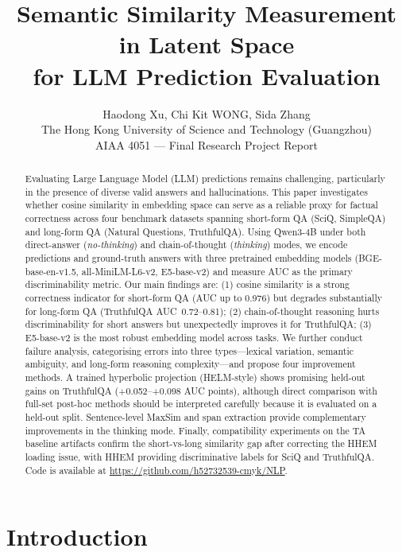 \documentclass{article}
\title{Semantic Similarity Measurement in Latent Space\\
       for LLM Prediction Evaluation}
\author{%
  Haodong Xu, Chi Kit WONG, Sida Zhang \\
  The Hong Kong University of Science and Technology (Guangzhou) \\
  AIAA 4051 --- Final Research Project Report
}
\begin{document}
\maketitle

\begin{abstract}
Evaluating Large Language Model (LLM) predictions remains challenging, particularly
in the presence of diverse valid answers and hallucinations.
This paper investigates whether cosine similarity in embedding space can serve as a
reliable proxy for factual correctness across four benchmark datasets spanning
short-form QA (SciQ, SimpleQA) and long-form QA (Natural Questions, TruthfulQA).
Using Qwen3-4B under both direct-answer (\emph{no-thinking}) and chain-of-thought
(\emph{thinking}) modes, we encode predictions and ground-truth answers with three
pretrained embedding models (BGE-base-en-v1.5, all-MiniLM-L6-v2, E5-base-v2) and
measure AUC as the primary discriminability metric.
Our main findings are: (1) cosine similarity is a strong correctness indicator for
short-form QA (AUC up to 0.976) but degrades substantially for long-form QA
(TruthfulQA AUC~0.72--0.81); (2) chain-of-thought reasoning hurts discriminability
for short answers but unexpectedly improves it for TruthfulQA; (3) E5-base-v2 is the
most robust embedding model across tasks.
We further conduct failure analysis, categorising errors into three types---lexical
variation, semantic ambiguity, and long-form reasoning complexity---and propose four
improvement methods. A trained hyperbolic projection (HELM-style) shows promising
held-out gains on TruthfulQA (+0.052--+0.098 AUC points), although direct comparison
with full-set post-hoc methods should be interpreted carefully because it is evaluated
on a held-out split.
Sentence-level MaxSim and span extraction provide complementary improvements in the
thinking mode.
Finally, compatibility experiments on the TA baseline artifacts confirm the
short-vs-long similarity gap after correcting the HHEM loading issue, with HHEM
providing discriminative labels for SciQ and TruthfulQA.
Code is available at \url{https://github.com/h52732539-cmyk/NLP}.
\end{abstract}

\section{Introduction}
\label{sec:intro}
\end{document}
